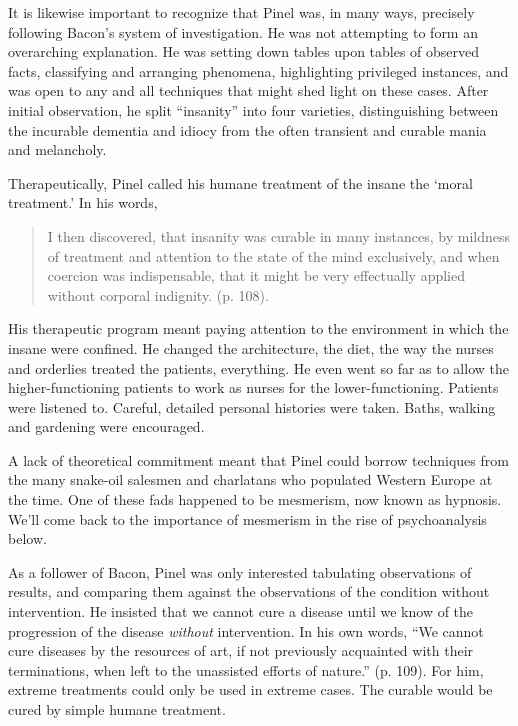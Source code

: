 It is likewise important to recognize that Pinel was, in many ways, precisely following Bacon's system of investigation. He was not attempting to form an overarching explanation. He was setting down tables upon tables of observed facts, classifying and arranging phenomena, highlighting privileged instances, and was open to any and all techniques that might shed light on these cases. After initial observation, he split ``insanity'' into four varieties, distinguishing between the incurable dementia and idiocy from the often transient and curable mania and melancholy.

Therapeutically, Pinel called his humane treatment of the insane the `moral treatment.' In his words,

\begin{quote}

I then discovered, that insanity was curable in many instances, by mildness of treatment and attention to the state of the mind exclusively, and when coercion was indispensable, that it might be very effectually applied without corporal indignity. (p. 108).
\end{quote}

His therapeutic program meant paying attention to the environment in which the insane were confined. He changed the architecture, the diet, the way the nurses and orderlies treated the patients, everything. He even went so far as to allow the higher-functioning patients to work as nurses for the lower-functioning. Patients were listened to. Careful, detailed personal histories were taken. Baths, walking and gardening were encouraged.

A lack of theoretical commitment meant that Pinel could borrow techniques from the many snake-oil salesmen and charlatans who populated Western Europe at the time. One of these fads happened to be mesmerism, now known as hypnosis. We'll come back to the importance of mesmerism in the rise of psychoanalysis below.

As a follower of Bacon, Pinel was only interested tabulating observations of results, and comparing them against the observations of the condition without intervention. He insisted that we cannot cure a disease until we know of the progression of the disease \emph{without} intervention. In his own words, ``We cannot cure diseases by the resources of art, if not previously acquainted with their terminations, when left to the unassisted efforts of nature.'' (p. 109). For him, extreme treatments could only be used in extreme cases. The curable would be cured by simple humane treatment.

